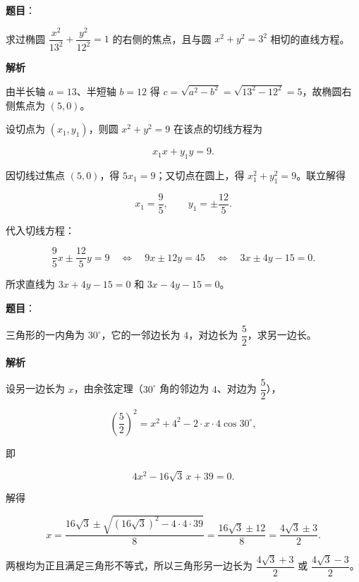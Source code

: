 \begin{answer}

\textbf{题目}：

求过椭圆 $\dfrac{x^2}{13^2}+\dfrac{y^2}{12^2}=1$ 的右侧的焦点，且与圆 $x^2+y^2=3^2$ 相切的直线方程。

\textbf{解析}

由半长轴 $a=13$、半短轴 $b=12$ 得 $c=\sqrt{a^2-b^2}=\sqrt{13^2-12^2}=5$，故椭圆右侧焦点为 $(5,0)$。

设切点为 $(x_1,y_1)$，则圆 $x^2+y^2=9$ 在该点的切线方程为

\nopagebreak[4]
\[
x_1x+y_1y=9.
\]

因切线过焦点 $(5,0)$，得 $5x_1=9$；又切点在圆上，得 $x_1^2+y_1^2=9$。联立解得

\nopagebreak[4]
\[
x_1=\frac95,
\qquad
y_1=\pm\frac{12}5.
\]

代入切线方程：

\nopagebreak[4]
\[
\frac95x\pm\frac{12}5y=9
\quad\Longleftrightarrow\quad
9x\pm12y=45
\quad\Longleftrightarrow\quad
3x\pm4y-15=0.
\]

所求直线为 $3x+4y-15=0$ 和 $3x-4y-15=0$。


\end{answer}
\begin{answer}

\textbf{题目}：

三角形的一内角为 $30^\circ$，它的一邻边长为 $4$，对边长为 $\dfrac52$，求另一边长。

\textbf{解析}

设另一边长为 $x$，由余弦定理（$30^\circ$ 角的邻边为 $4$、对边为 $\dfrac52$），

\nopagebreak[4]
\[
\left(\frac52\right)^2=x^2+4^2-2\cdot x\cdot4\cos30^\circ,
\]

即

\nopagebreak[4]
\[
4x^2-16\sqrt3\,x+39=0.
\]

解得

\nopagebreak[4]
\[
x=\frac{16\sqrt3\pm\sqrt{(16\sqrt3)^2-4\cdot4\cdot39}}{8}
=\frac{16\sqrt3\pm12}{8}
=\frac{4\sqrt3\pm3}{2}.
\]

两根均为正且满足三角形不等式，所以三角形另一边长为 $\dfrac{4\sqrt3+3}{2}$ 或 $\dfrac{4\sqrt3-3}{2}$。


\end{answer}
